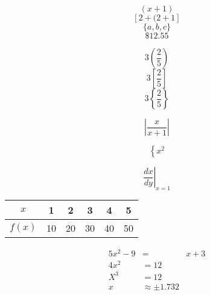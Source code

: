 \documentclass[11]{article}
\begin{document}
$$(x+1)$$
$$[2+(2+1]$$
$$\{a, b, c\}$$
$$\$12.55$$

$$3\left(\frac{2}{5}\right)$$
$$3\left[\frac{2}{5}\right]$$
$$3\left\{\frac{2}{5}\right\}$$

$$\left|\frac{x}{x+1}\right|$$

$$\left\{x^2\right.$$

$$\left.\frac{dx}{dy}\right|_{x=1}$$

\begin{tabular}{|c||c||c||c||c||c|}
\hline
$x$ & 1 & 2 & 3 & 4 & 5\\ \hline
$f(x)$ & 10 & 20 & 30 & 40 & 50\\ \hline
\end{tabular}

\begin{eqnarray}
5x^2-9&=&x+3\\
4x^2&=12\\
X^3&=12\\
x&\approx\pm1.732
\end{eqnarray}
\end{document}
